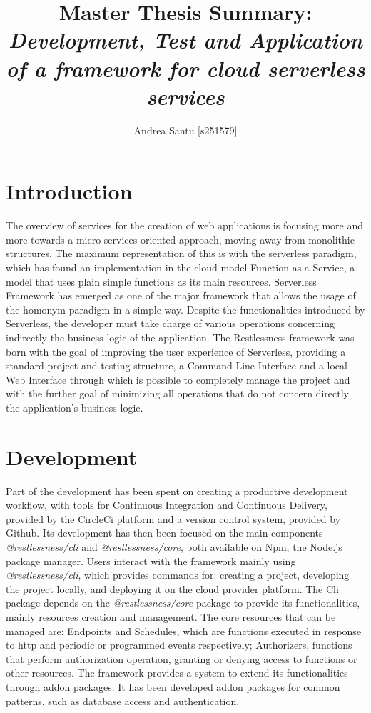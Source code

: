 \documentclass{article}
\begin{document}
\title{Master Thesis Summary: \textit{Development, Test and Application of a framework for cloud serverless services}}

\author{Andrea Santu [s251579]}

\maketitle

\section{Introduction}
The overview of services for the creation of web applications is focusing more
and more towards a micro services oriented approach, moving away from monolithic
structures.
The maximum representation of this is with the serverless paradigm, which has
found an implementation in the cloud model Function as a Service, a model that
uses plain simple functions as its main resources.
Serverless Framework has emerged as one of the major framework that allows the
usage of the homonym paradigm in a simple way.
Despite the functionalities introduced by Serverless, the developer must take
charge of various operations concerning indirectly the business logic of the
application.
The Restlessness framework was born with the goal of improving the user experience
of Serverless, providing a standard project and testing structure, a Command Line
Interface and a local Web Interface through which is possible to completely manage
the project and with the further goal of minimizing all operations that do not
concern directly the application's business logic.

\section{Development}
Part of the development has been spent on creating a productive development
workflow, with tools for Continuous Integration and Continuous Delivery, provided
by the CircleCi platform and a version control system, provided by Github.
Its development has then been focused on the main components
\mbox{\textit{@restlessness/cli}} and \mbox{\textit{@restlessness/core}}, both
available on Npm, the Node.js package manager.
Users interact with the framework mainly using \mbox{\textit{@restlessness/cli}},
which provides commands for: creating a project, developing the project locally,
and deploying it on the cloud provider platform.
The Cli package depends on the \mbox{\textit{@restlessness/core}} package to provide
its functionalities, mainly resources creation and management. The core resources
that can be managed are: Endpoints and Schedules, which are functions executed in
response to http and periodic or programmed events respectively; Authorizers,
functions that perform authorization operation, granting or denying access to
functions or other resources.
The framework provides a system to extend its functionalities through addon packages.
It has been developed addon packages for common patterns, such as database access
and authentication.
\end{document}
